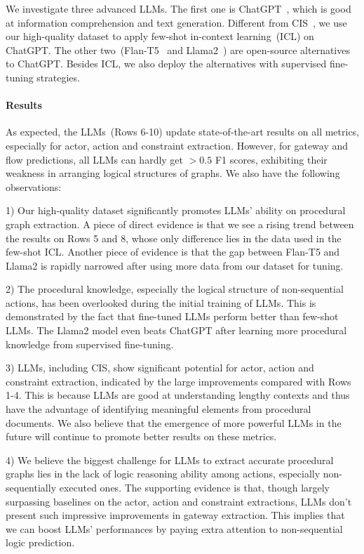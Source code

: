 We investigate three advanced LLMs. The first one is ChatGPT~\cite{ouyang2022training}, which is good at information comprehension and text generation. Different from CIS~\cite{bellan2022leveraging}, we use our high-quality dataset to apply few-shot in-context learning~(ICL) on ChatGPT. The other two~(Flan-T5~\cite{chung2022scaling} and Llama2~\cite{touvron2023llama}) are open-source alternatives to ChatGPT. Besides ICL, we also deploy the alternatives with supervised fine-tuning strategies.

\paragraph{Results}

As expected, the LLMs~(Rows 6-10) update state-of-the-art results on all metrics, especially for actor, action and constraint extraction. However, for gateway and flow predictions, all LLMs can hardly get $>0.5$ F1 scores, exhibiting their weakness in arranging logical structures of graphs. We also have the following observations: \par
1) Our high-quality dataset significantly promotes LLMs' ability on procedural graph extraction. A piece of direct evidence is that we see a rising trend between the results on Rows 5 and 8, whose only difference lies in the data used in the few-shot ICL. Another piece of evidence is that the gap between Flan-T5 and Llama2 is rapidly narrowed after using more data from our dataset for tuning. \par
2) The procedural knowledge, especially the logical structure of non-sequential actions, has been overlooked during the initial training of LLMs. This is demonstrated by the fact that fine-tuned LLMs perform better than few-shot LLMs. The Llama2 model even beats ChatGPT after learning more procedural knowledge from supervised fine-tuning. \par
3) LLMs, including CIS, show significant potential for actor, action and constraint extraction, indicated by the large improvements compared with Rows 1-4. This is because LLMs are good at understanding lengthy contexts and thus have the advantage of identifying meaningful elements from procedural documents. We also believe that the emergence of more powerful LLMs in the future will continue to promote better results on these metrics. \par
4) We believe the biggest challenge for LLMs to extract accurate procedural graphs lies in the lack of logic reasoning ability among actions, especially non-sequentially executed ones. The supporting evidence is that, though largely surpassing baselines on the actor, action and constraint extractions, LLMs don't present such impressive improvements in gateway extraction. This implies that we can boost LLMs' performances by paying extra attention to non-sequential logic prediction.

